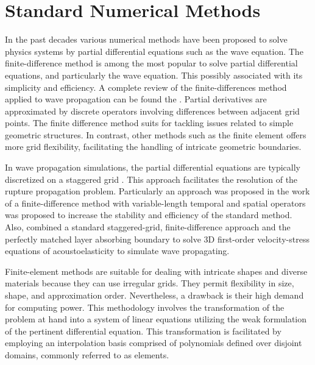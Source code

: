 \documentclass[11pt,twoside]{article}
\begin{document}
\section{Standard Numerical Methods}\label{sec:standard_numerical_methods}

In the past decades various numerical methods have been proposed to solve physics systems by partial differential 
equations such as the wave equation. The finite-difference method is among the most 
popular to solve partial differential equations, and particularly the wave equation. This possibly associated with 
its simplicity and efficiency. A complete review of the finite-differences method applied to wave propagation can be 
found the . Partial derivatives are approximated by discrete operators involving differences 
between adjacent grid points. The finite difference method suits for tackling issues related to simple geometric 
structures. In contrast, other methods such as the finite element offers more grid flexibility, facilitating the 
handling of intricate geometric boundaries.

In wave propagation simulations, the partial differential equations are typically discretized on a staggered grid 
\citep{madariaga_dynamics_1976,Virieux1986}. This approach facilitates the resolution of the rupture propagation 
problem. Particularly an approach was proposed in the work of  a finite-difference method 
with variable-length temporal and spatial operators was proposed to increase the stability and efficiency of the 
standard method. Also,  combined a standard staggered-grid, finite-difference 
approach and the perfectly matched layer absorbing boundary to solve 3D first-order velocity-stress equations of 
acoustoelasticity to simulate wave propagating.

Finite-element methods are suitable for dealing with intricate shapes and diverse materials because they can use 
irregular grids. They permit flexibility in size, shape, and approximation order. Nevertheless, a drawback is their 
high demand for computing power. This methodology involves the transformation of the problem at hand into a system 
of linear equations utilizing the weak formulation of the pertinent differential equation. This transformation is 
facilitated by employing an interpolation basis comprised of polynomials defined over disjoint domains, commonly 
referred to as elements.
\end{document}
